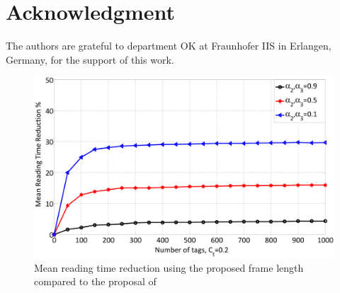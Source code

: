 \documentclass[10pt,conference,letterpaper]{RWWTemplate}
\begin{document}
\section*{Acknowledgment}

The authors are grateful to department OK at Fraunhofer IIS in Erlangen,
Germany, for the support of this work.

\begin{figure}
\includegraphics[width=1\columnwidth]{saving_time_new}\protect\caption{Mean reading time reduction using the proposed frame length compared
to the proposal of \cite{2012_journal_CR} \label{fig:Mean-reduction-in}}
\end{figure}



\end{document}
